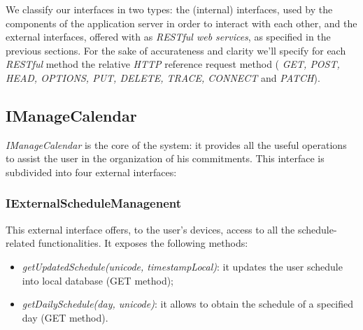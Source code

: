 We classify our interfaces in two types: the (internal) interfaces, used by the components of the application server in order to interact with each other, and the external interfaces, offered with as \textit{RESTful web services}, as specified in the previous sections. For the sake of accurateness and clarity we'll specify for each \textit{RESTful} method the relative \textit{HTTP} reference request method ( \textit{GET, POST, HEAD, OPTIONS, PUT, DELETE, TRACE, CONNECT} and \textit{PATCH}).
\subsection{IManageCalendar}
\label{subsect: IManageCalendar}
\textit{IManageCalendar} is the core of the system: it provides all the useful operations to assist the user in the organization of his commitments. This interface is subdivided into four external interfaces:

\subsubsection{IExternalScheduleManagenent}
This external interface offers, to the user's devices, access to all the schedule-related functionalities. It exposes the following methods:
\begin{itemize}
\item \textit{getUpdatedSchedule(unicode, timestampLocal)}: it updates the user schedule into local database (GET method);
\item \textit{getDailySchedule(day, unicode)}: it allows to obtain the schedule of a specified day (GET method).
\end{itemize}

